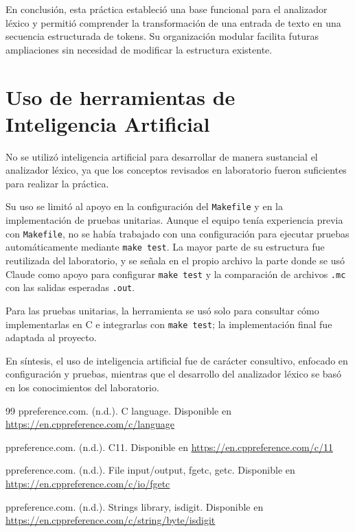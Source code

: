 \documentclass[12pt,letterpaper]{article}
\begin{document}
En conclusión, esta práctica estableció una base funcional para el analizador léxico y permitió comprender la transformación de una entrada de texto en una secuencia estructurada de tokens. Su organización modular facilita futuras ampliaciones sin necesidad de modificar la estructura existente.


\section*{Uso de herramientas de Inteligencia Artificial}
No se utilizó inteligencia artificial para desarrollar de manera sustancial el analizador léxico, ya que los conceptos revisados en laboratorio fueron suficientes para realizar la práctica.

Su uso se limitó al apoyo en la configuración del \texttt{Makefile} y en la implementación de pruebas unitarias. Aunque el equipo tenía experiencia previa con \texttt{Makefile}, no se había trabajado con una configuración para ejecutar pruebas automáticamente mediante \texttt{make test}. La mayor parte de su estructura fue reutilizada del laboratorio, y se señala en el propio archivo la parte donde se usó Claude como apoyo para configurar \texttt{make test} y la comparación de archivos \texttt{.mc} con las salidas esperadas \texttt{.out}.

Para las pruebas unitarias, la herramienta se usó solo para consultar cómo implementarlas en C e integrarlas con \texttt{make test}; la implementación final fue adaptada al proyecto.

En síntesis, el uso de inteligencia artificial fue de carácter consultivo, enfocado en configuración y pruebas, mientras que el desarrollo del analizador léxico se basó en los conocimientos del laboratorio.
\newpage


\begin{thebibliography}{99}
  ppreference.com. (n.d.). C language. Disponible en \textcolor{links}{\uline{\url{https://en.cppreference.com/c/language}}}

  ppreference.com. (n.d.). C11. Disponible en \textcolor{links}{\uline{\url{https://en.cppreference.com/c/11}}}

  ppreference.com. (n.d.). File input/output, fgetc, getc. Disponible en \textcolor{links}{\uline{\url{https://en.cppreference.com/c/io/fgetc}}}

  ppreference.com. (n.d.). Strings library, isdigit. Disponible en \textcolor{links}{\uline{\url{https://en.cppreference.com/c/string/byte/isdigit}}}
  
\end{thebibliography}
\end{document}
